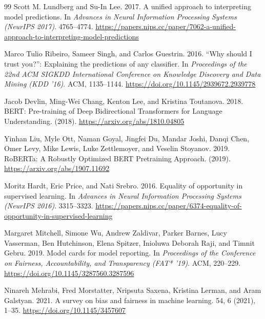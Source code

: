 \documentclass[sigconf]{acmart}
\begin{document}
\begin{thebibliography}{99}
Scott M. Lundberg and Su-In Lee. 2017.
\newblock A unified approach to interpreting model predictions.
\newblock In {\em Advances in Neural Information Processing Systems (NeurIPS 2017)}. 4765--4774. \url{https://papers.nips.cc/paper/7062-a-unified-approach-to-interpreting-model-predictions}

Marco Tulio Ribeiro, Sameer Singh, and Carlos Guestrin. 2016.
\newblock ``Why should I trust you?'': Explaining the predictions of any classifier.
\newblock In {\em Proceedings of the 22nd ACM SIGKDD International Conference on Knowledge Discovery and Data Mining (KDD '16)}. ACM, 1135--1144. \url{https://doi.org/10.1145/2939672.2939778}

Jacob Devlin, Ming-Wei Chang, Kenton Lee, and Kristina Toutanova. 2018.
\newblock BERT: Pre-training of Deep Bidirectional Transformers for Language Understanding.
 (2018). \url{https://arxiv.org/abs/1810.04805}

Yinhan Liu, Myle Ott, Naman Goyal, Jingfei Du, Mandar Joshi, Danqi Chen, Omer Levy, Mike Lewis, Luke Zettlemoyer, and Veselin Stoyanov. 2019.
\newblock RoBERTa: A Robustly Optimized BERT Pretraining Approach.
 (2019). \url{https://arxiv.org/abs/1907.11692}

Moritz Hardt, Eric Price, and Nati Srebro. 2016.
\newblock Equality of opportunity in supervised learning.
\newblock In {\em Advances in Neural Information Processing Systems (NeurIPS 2016)}. 3315--3323. \url{https://papers.nips.cc/paper/6374-equality-of-opportunity-in-supervised-learning}

Margaret Mitchell, Simone Wu, Andrew Zaldivar, Parker Barnes, Lucy Vasserman, Ben Hutchinson, Elena Spitzer, Inioluwa Deborah Raji, and Timnit Gebru. 2019.
\newblock Model cards for model reporting.
\newblock In {\em Proceedings of the Conference on Fairness, Accountability, and Transparency (FAT* '19)}. ACM, 220--229. \url{https://doi.org/10.1145/3287560.3287596}

Ninareh Mehrabi, Fred Morstatter, Nripsuta Saxena, Kristina Lerman, and Aram Galstyan. 2021.
\newblock A survey on bias and fairness in machine learning.
 54, 6 (2021), 1--35. \url{https://doi.org/10.1145/3457607}

\end{thebibliography}
\end{document}
